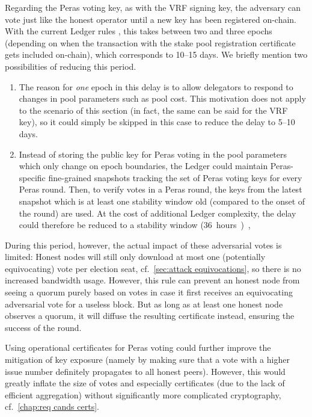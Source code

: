Regarding the Peras voting key, as with the VRF signing key, the adversary can vote just like the honest operator until a new key has been registered on-chain.
With the current Ledger rules \parencite[Section 9.4 \enquote{Stake Pool Rules}]{shelley-ledger-specs}, this takes between two and three epochs (depending on when the transaction with the stake pool registration certificate gets included on-chain), which corresponds to \numrange{10}{15} days.
We briefly mention two possibilities of reducing this period.
\begin{enumerate}
\item
  The reason for \emph{one} epoch in this delay is to allow delegators to respond to changes in pool parameters such as pool cost.
  This motivation does not apply to the scenario of this section (in fact, the same can be said for the VRF key), so it could simply be skipped in this case to reduce the delay to \numrange{5}{10} days.
\item
  Instead of storing the public key for Peras voting in the pool parameters which only change on epoch boundaries, the Ledger could maintain Peras-specific fine-grained snapshots tracking the set of Peras voting keys for every Peras round.
  Then, to verify votes in a Peras round, the keys from the latest snapshot which is at least one stability window old (compared to the onset of the round) are used.
  At the cost of additional Ledger complexity, the delay could therefore be reduced to a stability window (\qty{36} hours),
\end{enumerate}

During this period, however, the actual impact of these adversarial votes is limited:
Honest nodes will still only download at most one (potentially equivocating) vote per election seat, cf.~\cref{sec:attack equivocations}, so there is no increased bandwidth usage.
However, this rule can prevent an honest node from seeing a quorum purely based on votes in case it first receives an equivocating adversarial vote for a useless block.
But as long as at least one honest node observes a quorum, it will diffuse the resulting certificate instead, ensuring the success of the round.

Using operational certificates for Peras voting could further improve the mitigation of key exposure (namely by making sure that a vote with a higher issue number definitely propagates to all honest peers).
However, this would greatly inflate the size of votes and especially certificates (due to the lack of efficient aggregation) without significantly more complicated cryptography, cf.~\cref{chap:req cands certs}.

